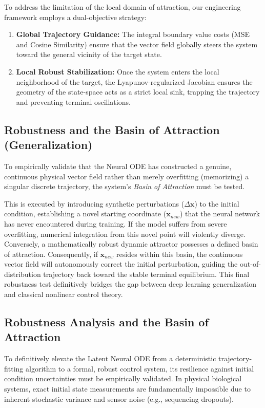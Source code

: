 \documentclass[12pt, a4paper]{article}
\begin{document}
	To address the limitation of the local domain of attraction, our engineering framework employs a dual-objective strategy:
	\begin{enumerate}
		\item \textbf{Global Trajectory Guidance:} The integral boundary value costs (MSE and Cosine Similarity) ensure that the vector field globally steers the system toward the general vicinity of the target state.
		\item \textbf{Local Robust Stabilization:} Once the system enters the local neighborhood of the target, the Lyapunov-regularized Jacobian ensures the geometry of the state-space acts as a strict local sink, trapping the trajectory and preventing terminal oscillations.
	\end{enumerate}
	
	\subsection{Robustness and the Basin of Attraction (Generalization)}
	To empirically validate that the Neural ODE has constructed a genuine, continuous physical vector field rather than merely overfitting (memorizing) a singular discrete trajectory, the system's \textit{Basin of Attraction} must be tested.
	
	This is executed by introducing synthetic perturbations ($\Delta \mathbf{x}$) to the initial condition, establishing a novel starting coordinate ($\mathbf{x}_{new}$) that the neural network has never encountered during training. If the model suffers from severe overfitting, numerical integration from this novel point will violently diverge. Conversely, a mathematically robust dynamic attractor possesses a defined basin of attraction. Consequently, if $\mathbf{x}_{new}$ resides within this basin, the continuous vector field will autonomously correct the initial perturbation, guiding the out-of-distribution trajectory back toward the stable terminal equilibrium. This final robustness test definitively bridges the gap between deep learning generalization and classical nonlinear control theory.
	
	\subsection{Robustness Analysis and the Basin of Attraction}
	
	To definitively elevate the Latent Neural ODE from a deterministic trajectory-fitting algorithm to a formal, robust control system, its resilience against initial condition uncertainties must be empirically validated. In physical biological systems, exact initial state measurements are fundamentally impossible due to inherent stochastic variance and sensor noise (e.g., sequencing dropouts).
	
\end{document}
